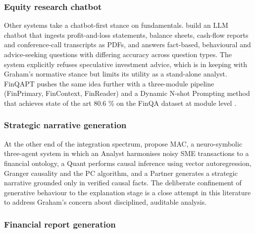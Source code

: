 \subsubsection{Equity research chatbot}
\label{sec:equity-chatbot}

Other systems take a chatbot-first stance on fundamentals.
\citet{dongare2024} build an LLM chatbot that ingests
profit-and-loss statements, balance sheets, cash-flow reports and
conference-call transcripts as PDFs, and answers fact-based,
behavioural and advice-seeking questions with differing accuracy
across question types. The system explicitly refuses speculative
investment advice, which is in keeping with Graham's normative stance
but limits its utility as a stand-alone analyst. FinQAPT pushes the same idea further with a three-module pipeline (FinPrimary,
FinContext, FinReader) and a Dynamic N-shot Prompting method that
achieves state of the art 80.6 \% on the FinQA dataset at
module level \citep{singh2024finqapt}. 

\subsubsection{Strategic narrative generation}
\label{sec:strategic-narrative}

At the other end of the integration spectrum, \citet{saravanan2026} propose MAC, a
neuro-symbolic three-agent system in which an Analyst harmonises
noisy SME transactions to a financial ontology, a Quant performs
causal inference using vector autoregression, Granger causality and
the PC algorithm, and a Partner generates a strategic narrative
grounded only in verified causal facts. The deliberate confinement
of generative behaviour to the explanation stage is a close attempt in this literature to address Graham's concern about disciplined, auditable analysis.

\subsubsection{Financial report generation}
\label{sec:financial-report-generation}

